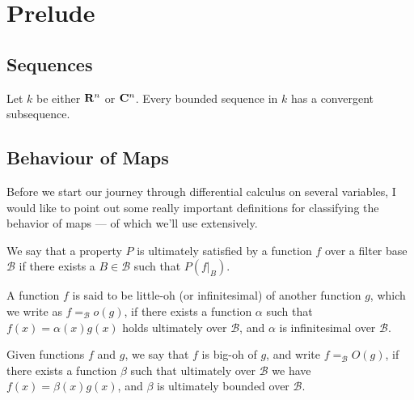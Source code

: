 \section{Prelude}

\subsection{Sequences}


\begin{theorem}
\label{thm:bolzano-weierstrass}
Let \(k\) be either \(\mathbf{R}^n\) or \(\mathbf{C}^n\). Every bounded sequence in \(k\) has a
convergent subsequence.
\end{theorem}


\subsection{Behaviour of Maps}

Before we start our journey through differential calculus on several variables,
I would like to point out some really important definitions for classifying the
behavior of maps --- of which we'll use extensively.

\begin{definition}[Ultimately]
We say that a property \(P\) is ultimately satisfied by a function \(f\) over
a filter base \(\mathcal B\) if there exists a \(B \in \mathcal B\) such that
\(P(f|_B)\).
\end{definition}

\begin{definition}[Little-oh]\label{def: little oh}
A function \(f\) is said to be little-oh (or infinitesimal) of another
function \(g\), which we write as \(f =_{\mathcal B} o(g)\), if there exists
a function \(\alpha\) such that \(f(x) = \alpha(x) g(x)\) holds ultimately
over \(\mathcal B\), and \(\alpha\) is infinitesimal over \(\mathcal B\).
\end{definition}

\begin{definition}[Big-oh]\label{def: big oh}
Given functions \(f\) and \(g\), we say that \(f\) is big-oh of \(g\), and
write \(f =_{\mathcal B} O(g)\), if there exists a function \(\beta\) such
that ultimately over \(\mathcal B\) we have \(f(x) = \beta(x) g(x)\), and
\(\beta\) is ultimately bounded over \(\mathcal B\).
\end{definition}

